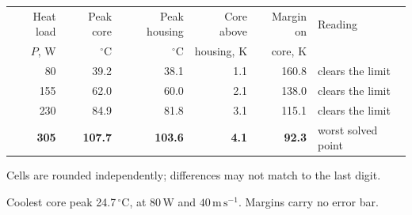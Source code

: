 \documentclass[9pt,a4paper]{article}
\renewcommand{\footnotesize}{\fontsize{6.9}{7.9}\selectfont}
\begin{document}
\vspace{1.5pt}
{\fontsize{6.7}{7.7}\selectfont
\begin{tabular}{r r r r r l}
\toprule
Heat load & Peak core & Peak housing & Core above & Margin on & Reading \\
$P$, W & $^{\circ}\mathrm{C}$ & $^{\circ}\mathrm{C}$ & housing, K &
core, K & \\
\midrule
80 & 39.2 & 38.1 & 1.1 & 160.8 & clears the limit \\
155 & 62.0 & 60.0 & 2.1 & 138.0 & clears the limit \\
230 & 84.9 & 81.8 & 3.1 & 115.1 & clears the limit \\
\textbf{305} & \textbf{107.7} & \textbf{103.6} & \textbf{4.1} & \textbf{92.3} & worst solved point \\
\bottomrule
\end{tabular}}

\vspace{1pt}
{\footnotesize Cells are rounded independently; differences may not match to
the last digit.}

\vspace{1.5pt}
{\footnotesize Coolest core peak 24.7$\,^{\circ}\mathrm{C}$, at
$80\,\mathrm{W}$ and $40\,\mathrm{m\,s^{-1}}$. Margins carry no error bar.}
\end{document}
